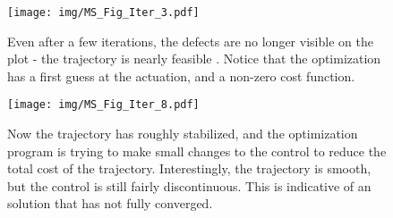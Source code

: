 
\begin{figure} 
    \centering 
    \texttt{[image: img/MS\_Fig\_Iter\_3.pdf]}    
    \caption{Even after a few iterations, the defects are no longer visible on the plot - the trajectory is nearly feasible . Notice that the optimization has a first guess at the actuation, and a non-zero cost function.}     
    \label{fig: MS_Fig_Iter_3}     
\end{figure} 


\begin{figure} 
    \centering 
    \texttt{[image: img/MS\_Fig\_Iter\_8.pdf]}    
    \caption{Now the trajectory has roughly stabilized, and the optimization program is trying to make small changes to the control to reduce the total cost of the trajectory. Interestingly, the trajectory is smooth, but the control is still fairly discontinuous. This is indicative of an solution that has not fully converged.}     
    \label{fig: MS_Fig_Iter_8}     
\end{figure} 




